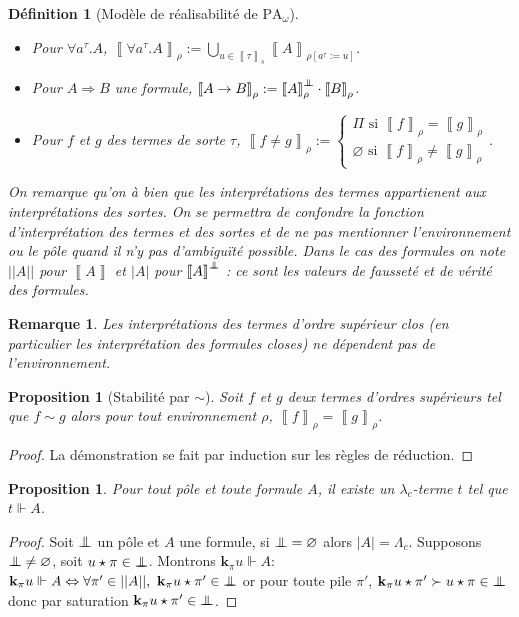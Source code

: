 \documentclass[a4paper,12pt]{article}
\newtheorem{prop}[theo]{Proposition}
\newtheorem{defi}[theo]{Définition}
\theoremstyle{rmqstyle}
\newtheorem{rmq}[theo]{Remarque}
\newcommand{\abs}[1]{\lvert#1\rvert}
\newcommand{\abss}[1]{\lvert \lvert#1\rvert \rvert}
\newcommand{\itp}[1]{\left\llbracket#1\right\rrbracket}
\newcommand{\PA}{\mathrm{PA}}
\renewcommand{\implies}{\Rightarrow}
\renewcommand{\iff}{\Leftrightarrow}
\renewcommand{\k}{\mathbf{k}}
\newcommand{\pole}{{\protect\mathpalette{\protect\polehelper}{\bot}}} \def\polehelper#1#2{\mathrel{\rlap{$#1#2$}\mkern3mu{#1#2}}}
\begin{document}
\begin{defi}[Modèle de réalisabilité de $\PA_\omega$]
\begin{itemize}
\item Pour $\forall a^\tau. A$, $\itp{\forall a^\tau. A}_\rho := \bigcup_{u \in \itp{\tau}_s} \itp{A}_{\rho[a^\tau := u]}$.\\
\item Pour $A \implies B$ une formule, $\itp{A \to B}_\rho := \itp{A}_\rho^\pole \cdot \itp{B}_\rho$.\\
\item Pour $f$ et $g$ des termes de sorte $\tau$, $\itp{f \neq g}_\rho := 
\left\{ \begin{array}{c}
\Pi \text{ si } \itp{f}_\rho = \itp{g}_\rho \\
\varnothing \text{ si } \itp{f}_\rho \neq \itp{g}_\rho
\end{array}\right.$.
\end{itemize}
On remarque qu'on à bien que les interprétations des termes appartienent aux interprétations des sortes. On se permettra de confondre la fonction d'interprétation des termes et des sortes et de ne pas mentionner l'environnement ou le pôle quand il n'y pas d'ambiguïté possible. Dans le cas des formules on note $\abss{A}$ pour $\itp{A}$ et $\abs{A}$ pour $\itp{A}^\pole$ : ce sont les valeurs de fausseté et de vérité des formules.  
\end{defi}

\begin{rmq}
Les interprétations des termes d'ordre supérieur clos (en particulier les interprétation des formules closes) ne dépendent pas de l'environnement. 
\end{rmq}

\begin{prop}[Stabilité par $\sim$]
\label{sim stab}
Soit $f$ et $g$ deux termes d'ordres supérieurs tel que $f \sim g$ alors pour tout environnement $\rho$, $\itp{f}_\rho = \itp{g}_\rho$.
\end{prop}

\begin{proof}
La démonstration se fait par induction sur les règles de réduction.
\end{proof}

\begin{prop}
Pour tout pôle et toute formule $A$, il existe un $\lambda_c$-terme $t$ tel que $t \Vdash A$.
\end{prop}

\begin{proof}
Soit $\pole$ un pôle et $A$ une formule, si $\pole = \varnothing$ alors $\abs{A} = \Lambda_c$. Supposons $\pole \neq \varnothing$, soit $u \star \pi \in \pole$. Montrons $\k_\pi u \Vdash A$:\\
$\k_\pi u \Vdash A \iff \forall \pi' \in \abss{A}, \  \k_\pi u \star \pi' \in \pole$ or pour toute pile $\pi'$, $\k_\pi u \star \pi' \succ u \star \pi \in \pole$ donc par saturation $\k_\pi u \star \pi' \in \pole$.
\end{proof}
\end{document}
